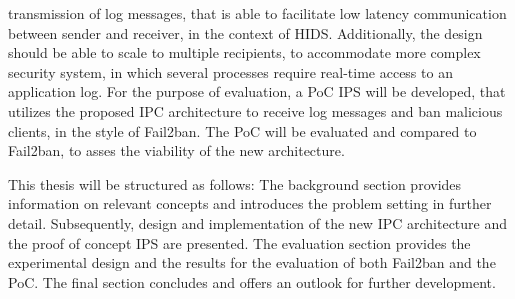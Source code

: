 transmission of log messages, that is able to facilitate low latency communication
between sender and receiver, in the context of \ac{HIDS}. Additionally, the design should be able to scale to multiple
recipients, to accommodate more complex security system, in which several processes
require real-time access to an application log. For the purpose of evaluation, a \ac{PoC} \ac{IPS} will be 
developed, that utilizes the proposed \ac{IPC} architecture to receive log messages and ban malicious
clients, in the style of Fail2ban. The \ac{PoC} will be evaluated and compared to Fail2ban, to asses the viability of the new architecture. 
\par 
This thesis will be structured as follows: The background section provides 
information on relevant concepts and introduces the problem setting in further detail. Subsequently, design and implementation
of the new \ac{IPC} architecture and the proof of concept \ac{IPS} are presented. The evaluation section provides the experimental design and the results for the 
evaluation of both Fail2ban and the \ac{PoC}. The final section concludes and offers an outlook for further development.   